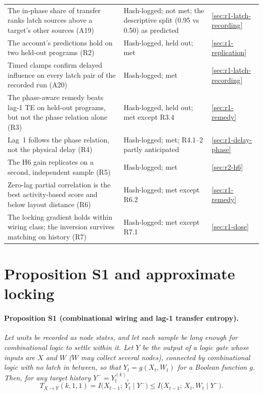 {\begin{longtable}{@{}L{0.55\textwidth}L{0.28\textwidth}l@{}}
    The in-phase share of transfer ranks latch sources above a target's other sources (A19) & Hash-logged; not met; the descriptive split (0.95 vs 0.50) as predicted & \ref{sec:r1-latch-recording} \\
    The account's predictions hold on two held-out programs (R2) & Hash-logged, held out; met & \ref{sec:r1-replication} \\
    Timed clamps confirm delayed influence on every latch pair of the recorded run (A20) & Hash-logged; met & \ref{sec:r1-latch-recording} \\
    The phase-aware remedy beats lag-1 TE on held-out programs, but not the phase relation alone (R3) & Hash-logged, held out; met except R3.4 & \ref{sec:r1-remedy} \\
    Lag~1 follows the phase relation, not the physical delay (R4) & Hash-logged; met; R4.1--2 partly anticipated & \ref{sec:r1-delay-phase} \\
    The H6 gain replicates on a second, independent sample (R5) & Hash-logged; met & \ref{sec:r2-h6} \\
    Zero-lag partial correlation is the best activity-based score and below layout distance (R6) & Hash-logged; met except R6.2 & \ref{sec:r1-remedy} \\
    The locking gradient holds within wiring class; the inversion survives matching on history (R7) & Hash-logged; met except R7.1 & \ref{sec:r1-dose} \\
    \bottomrule
\end{longtable}}

\section{Proposition S1 and approximate locking}
\label{app:ch2-moved}

\paragraph{Proposition S1 (combinational wiring and lag-1 transfer entropy).}
\emph{Let units be recorded as node states, and let each sample be long enough for combinational logic to settle within it. Let $Y$ be the output of a logic gate whose inputs are $X$ and $W$ ($W$ may collect several nodes), connected by combinational logic with no latch in between, so that $Y_t = g(X_t, W_t)$ for a Boolean function $g$. Then, for any target history $Y^- = Y_t^{(k)}$,}
\begin{equation}
  T_{X \to Y}(k, 1, 1) = I\big(X_{t-1};\,Y_t \mid Y^-\big) \le I\big(X_{t-1};\,X_t, W_t \mid Y^-\big).
  \label{eq:prop1}
\end{equation}

